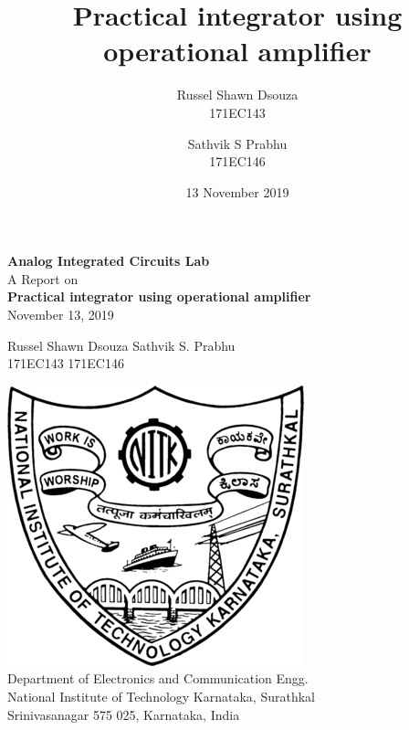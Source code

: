 \documentclass[12pt, titlepage]{article}
\title{\textbf{Practical integrator using operational amplifier}}
\author{
  Russel Shawn Dsouza\\
  171EC143
  \and
  Sathvik S Prabhu\\
  171EC146
}
\date{13 November 2019}
\theoremstyle{definition}
\begin{document}
  \begin{titlepage}
    \begin{center}
      \LARGE{\textbf{Analog Integrated Circuits Lab}}\\
      \vspace*{2em}
      \LARGE{A Report on}\\
      \huge{\textbf{Practical integrator using operational amplifier}}\\
      \vspace*{1em}
      \LARGE{November 13, 2019}
    \end{center}

    \vspace*{2em}
    \hspace*{5em} \Large{Russel Shawn Dsouza} \hspace*{5em} \Large{Sathvik S. Prabhu}\\
    \hspace*{6em} \Large{171EC143} \hspace*{10em} \Large{171EC146}\\
    \vspace*{2em}
    \begin{center}
    \includegraphics[scale=0.5]{logo.png}\\
    \vspace*{3em}
    Department of Electronics and Communication Engg.\\
    National Institute of Technology Karnataka, Surathkal\\
    Srinivasanagar 575 025, Karnataka, India
    \end{center}
  \end{titlepage}
  \thispagestyle{empty}

  \newpage
  \tableofcontents
  \thispagestyle{empty}
\end{document}
